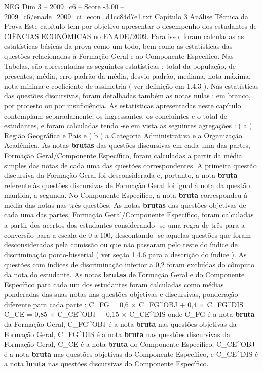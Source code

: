 \begin{textsample}{NEG Dim 3 – 2009\_c6 – Score -3.00 – 2009\_c6/enade\_2009\_ci\_econ\_d1cc84d7e1.txt}  \label{ex:f3_neg_047}
Capítulo 3 Análise Técnica da Prova Este capítulo tem por objetivo apresentar o desempenho dos estudantes de CIÊNCIAS ECONÔMICAS no ENADE/2009.
Para isso, foram calculadas as estatísticas básicas da prova como um todo, bem como as estatísticas das questões relacionadas à Formação Geral e ao Componente Específico.
Nas Tabelas, são apresentadas as seguintes estatísticas : total da população, de presentes, média, erro-padrão da média, desvio-padrão, mediana, nota máxima, nota mínima e coeficiente de assimetria ( ver definição em 1.4.3 ).
Nas estatísticas das questões discursivas, foram detalhadas também as notas nulas : em branco, por protesto ou por insuficiência.
As estatísticas apresentadas neste capítulo contemplam, separadamente, os ingressantes, os concluintes e o total de estudantes, e foram calculadas tendo -se em vista as seguintes agregações : ( a ) Região Geográfica e País e ( b ) a Categoria Administrativa e a Organização Acadêmica.
As notas \textbf{brutas} das questões discursivas em cada uma das partes, Formação Geral/Componente Específico, foram calculadas a partir da média simples das notas de cada uma das questões correspondentes.
A primeira questão discursiva da Formação Geral foi desconsiderada e, portanto, a nota \textbf{bruta} referente às questões discursivas de Formação Geral foi igual à nota da questão mantida, a segunda.
No Componente Específico, a nota \textbf{bruta} correspondeu à média das notas nas três questões.
As notas \textbf{brutas} das questões objetivas de cada uma das partes, Formação Geral/Componente Específico, foram calculadas a partir dos acertos dos estudantes considerando -se uma regra de três para a conversão para a escala de 0 a 100, descontando -se aquelas questões que foram desconsideradas pela comissão ou que não passaram pelo teste do índice de discriminação ponto-bisserial ( ver seção 1.4.6 para a descrição do índice ).
As questões com índices de discriminação inferior a 0,2 foram excluídas do cômputo da nota do estudante.
As notas \textbf{brutas} de Formação Geral e do Componente Específico para cada um dos estudantes foram calculadas como médias ponderadas das suas notas nas questões objetivas e discursivas, ponderação diferente para cada parte : C\_FG = 0,6 × C\_FG\textasciicircum{}OBJ + 0,4 × C\_FG\textasciicircum{}DIS C\_CE = 0,85 × C\_CE\textasciicircum{}OBJ + 0,15 × C\_CE\textasciicircum{}DIS onde C\_FG é a nota \textbf{bruta} da Formação Geral, C\_FG\textasciicircum{}OBJ é a nota \textbf{bruta} nas questões objetivas da Formação Geral, C\_FG\textasciicircum{}DIS é a nota \textbf{bruta} nas questões discursivas da Formação Geral, C\_CE é a nota \textbf{bruta} do Componente Específico, C\_CE\textasciicircum{}OBJ é a nota \textbf{bruta} nas questões objetivas do Componente Específico, e C\_CE\textasciicircum{}DIS é a nota \textbf{bruta} nas questões discursivas do Componente Específico.

\end{textsample}
